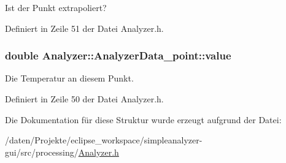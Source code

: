 Ist der Punkt extrapoliert? 



Definiert in Zeile 51 der Datei Analyzer.\-h.

\hypertarget{structAnalyzer_1_1AnalyzerData__point_a150b00a3d0be5d1c75b39292d213cbfa}{
\subsubsection[{value}]{\setlength{\rightskip}{0pt plus 5cm}double Analyzer\-::\-Analyzer\-Data\-\_\-point\-::value}}\label{structAnalyzer_1_1AnalyzerData__point_a150b00a3d0be5d1c75b39292d213cbfa}


Die Temperatur an diesem Punkt. 



Definiert in Zeile 50 der Datei Analyzer.\-h.



Die Dokumentation für diese Struktur wurde erzeugt aufgrund der Datei\-:\begin{DoxyCompactItemize}
\item 
/daten/\-Projekte/eclipse\-\_\-workspace/simpleanalyzer-\/gui/src/processing/\hyperlink{Analyzer_8h}{Analyzer.\-h}\end{DoxyCompactItemize}
